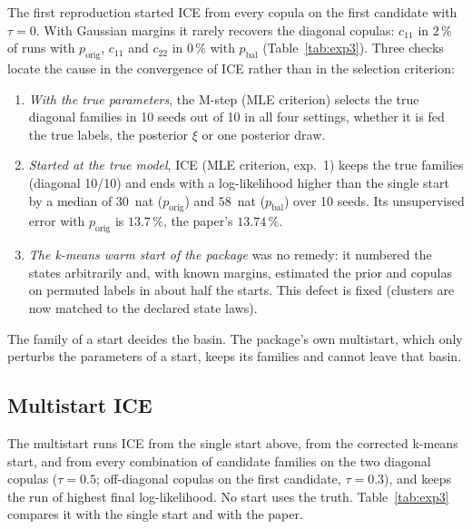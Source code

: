 \documentclass[11pt,a4paper]{article}
\newcommand{\porig}{p_{\text{orig}}}
\newcommand{\pbal}{p_{\text{bal}}}
\begin{document}
The first reproduction started ICE from every copula on the first candidate
with $\tau=0$. With Gaussian margins it rarely recovers the diagonal
copulas: $c_{11}$ in $2\,\%$ of runs with $\porig$, $c_{11}$ and $c_{22}$ in
$0\,\%$ with $\pbal$ (Table~\ref{tab:exp3}). Three checks locate the cause in
the convergence of ICE rather than in the selection criterion:
\begin{enumerate}
  \item \emph{With the true parameters}, the M-step (MLE criterion) selects
        the true diagonal families in 10 seeds out of 10 in all four
        settings, whether it is fed the true labels, the posterior $\xi$ or
        one posterior draw.
  \item \emph{Started at the true model}, ICE (MLE criterion, exp.~1) keeps
        the true families (diagonal 10/10) and ends with a log-likelihood
        higher than the single start by a median of $30$~nat ($\porig$) and
        $58$~nat ($\pbal$) over 10 seeds. Its unsupervised error with $\porig$ is
        $13.7\,\%$, the paper's $13.74\,\%$.
  \item \emph{The k-means warm start of the package} was no remedy: it
        numbered the states arbitrarily and, with known margins, estimated
        the prior and copulas on permuted labels in about half the starts.
        This defect is fixed (clusters are now matched to the declared state
        laws).
\end{enumerate}
The family of a start decides the basin. The package's own multistart, which
only perturbs the parameters of a start, keeps its families and cannot leave
that basin.

\subsection{Multistart ICE}

The multistart runs ICE from the single start above, from the corrected
k-means start, and from every combination of candidate families on the two
diagonal copulas ($\tau=0.5$; off-diagonal copulas on the first candidate,
$\tau=0.3$), and keeps the run of highest final log-likelihood. No start uses
the truth. Table~\ref{tab:exp3} compares it with the single start and with
the paper.

\begin{table}[htbp]
  \centering\small
  \caption{Right copula family chosen (\%) and mean error rate (\%), Huard
           criterion, pair margins. Paper: Tables~6--7 (10 runs) and the
           error rates of its §4.3 (given for $\porig$ only).}
  \label{tab:exp3}
  
\end{table}
\end{document}
